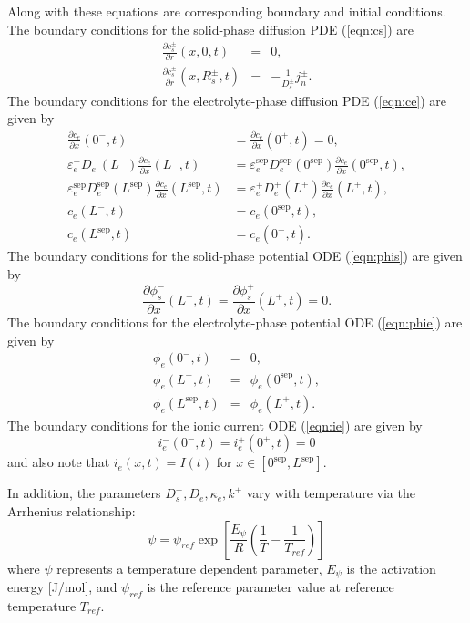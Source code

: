 \documentclass[12pt]{article}
\newcommand{\pard}[2]{\frac{\partial #1}{\partial #2}}
\begin{document}
Along with these equations are corresponding boundary and initial conditions. The boundary conditions for the solid-phase diffusion PDE (\ref{eqn:cs}) are
\begin{eqnarray}
	\frac{\partial c_{s}^{\pm}}{\partial r}(x,0,t) &=& 0, \label{eqn:cs-bc1} \\
	\frac{\partial c_{s}^{\pm}}{\partial r}(x,R_{s}^{\pm},t) &=& -\frac{1}{D_{s}^{\pm}} j_{n}^{\pm} \label{eqn:cs-bc2}.
\end{eqnarray}
The boundary conditions for the electrolyte-phase diffusion PDE (\ref{eqn:ce}) are given by
\begin{align}
	\pard{c_{e}}{x}(0^{-},t) &= \pard{c_{e}}{x}(0^{+},t) = 0, \label{eqn:ce-bc1} \\
	\varepsilon_{e}^{-} D_{e}^{-}(L^{-}) \pard{c_{e}}{x}(L^{-},t) &= \varepsilon_{e}^{\textrm{sep}}D_{e}^{\textrm{sep}}(0^{\textrm{sep}}) \pard{c_{e}}{x}(0^{\textrm{sep}},t), \\
	\varepsilon_{e}^{\textrm{sep}}D_{e}^{\textrm{sep}}(L^{\textrm{sep}}) \pard{c_{e}}{x}(L^{\textrm{sep}},t) &= \varepsilon_{e}^{+} D_{e}^{+}(L^{+}) \pard{c_{e}}{x}(L^{+},t), \\
	c_{e}(L^{-},t) &= c_{e}(0^{\textrm{sep}},t), \\
	c_{e}(L^{\textrm{sep}},t) &= c_{e}(0^+,t). \label{eqn:ce-bc5}
\end{align}
The boundary conditions for the solid-phase potential ODE (\ref{eqn:phis}) are given by
\begin{equation}\label{eqn:phis-bc}
	\pard{\phi_{s}^{-}}{x}(L^{-},t) = \pard{\phi_{s}^{+}}{x}(L^{+},t) = 0.
\end{equation}
The boundary conditions for the electrolyte-phase potential ODE (\ref{eqn:phie}) are given by
\begin{eqnarray}
	\phi_{e}(0^{-},t) &=& 0, \\
	\phi_{e}(L^{-},t) &=& \phi_{e}(0^{\textrm{sep}},t), \\
	\phi_{e}(L^{\textrm{sep}},t) &=& \phi_{e}(L^+,t).
\end{eqnarray}
The boundary conditions for the ionic current ODE (\ref{eqn:ie}) are given by
\begin{equation}\label{eqn:ie-bcs}
	i_{e}^{-}(0^{-},t) = i_{e}^{+}(0^+,t) = 0
\end{equation}
and also note that $i_{e}(x,t) = I(t)$ for $x \in [0^{\textrm{sep}}, L^{\textrm{sep}}]$.

In addition, the parameters $D_s^{\pm}, D_e, \kappa_e, k^{\pm}$ vary with temperature via the Arrhenius relationship:
\begin{equation}\label{eqn:arrhenius}
	\psi = \psi_{ref} \exp \left[\frac{E_\psi}{R} \left( \frac{1}{T} - \frac{1}{T_{ref}} \right) \right]
\end{equation}
where $\psi$ represents a temperature dependent parameter, $E_{\psi}$ is the activation energy [J/mol], and $\psi_{ref}$ is the reference parameter value at reference temperature $T_{ref}$.
\end{document}

